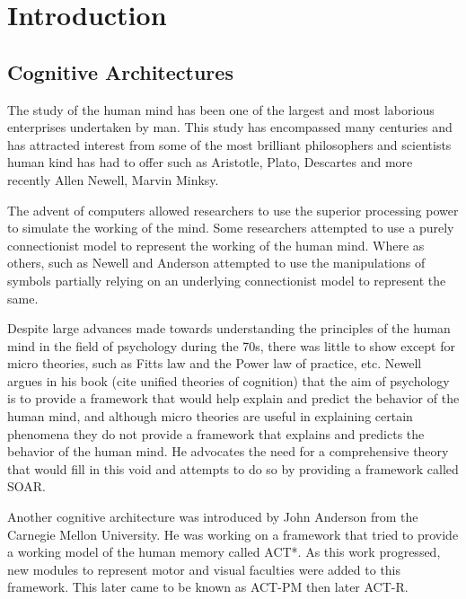 \chapter{Introduction}
\label{chap-one}


\section {Cognitive Architectures}
\label{introCogArch}
The study of the human mind has been one of the largest and most
laborious enterprises undertaken by man. This study has encompassed many
centuries and has attracted interest from some of the most brilliant
philosophers and scientists human kind has had to offer such as
Aristotle, Plato, Descartes and more recently Allen Newell, Marvin
Minksy. 

The advent of computers allowed researchers to use the superior
processing power to simulate the working of the
mind. Some researchers attempted to use a purely connectionist model to
represent the working of the human mind. Where as
others, such as Newell and Anderson attempted to use the manipulations
of symbols partially relying on an underlying connectionist model to
represent the same.  

Despite large advances made towards understanding the principles of
the human mind in the field of psychology during the 70s, there was little to show
except for micro theories, such as Fitts law and the Power law of
practice, etc. Newell argues in his book (cite unified theories
of cognition) that the aim of psychology is to provide a framework
that would help explain and predict the behavior of the human mind, and although micro
theories are useful in explaining certain phenomena they do not provide a
framework that explains and predicts the behavior of the human
mind. He advocates the need for a comprehensive theory that would fill
in this void and attempts to do so by providing a framework called SOAR. 

Another cognitive architecture was introduced by John Anderson from
the Carnegie Mellon University. He was working on a framework that
tried to provide a working model of the 
human memory called ACT*. As this work progressed, new modules to
represent motor and visual faculties were added to this
framework. This later came to be known as ACT-PM then later ACT-R. 

